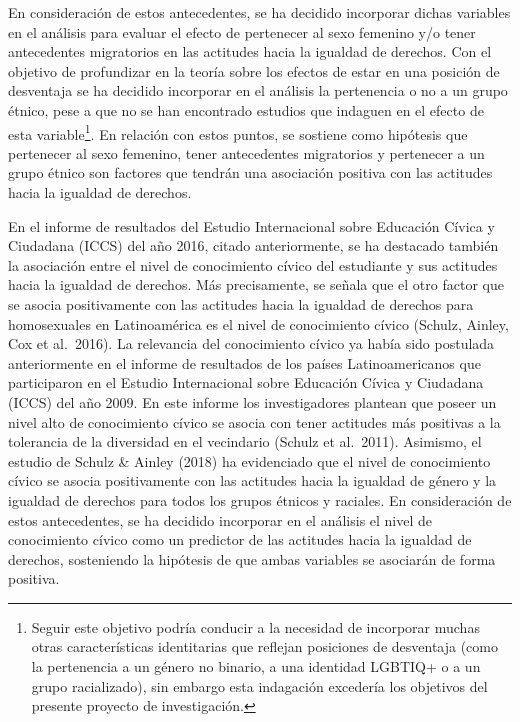\documentclass[12pt,twoside]{templates/facsothesis}
\begin{document}
En consideración de estos antecedentes, se ha decidido incorporar dichas variables en el análisis para evaluar el efecto de pertenecer al sexo femenino y/o tener antecedentes migratorios en las actitudes hacia la igualdad de derechos. Con el objetivo de profundizar en la teoría sobre los efectos de estar en una posición de desventaja se ha decidido incorporar en el análisis la pertenencia o no a un grupo étnico, pese a que no se han encontrado estudios que indaguen en el efecto de esta variable\footnote{Seguir este objetivo podría conducir a la necesidad de incorporar muchas otras características identitarias que reflejan posiciones de desventaja (como la pertenencia a un género no binario, a una identidad LGBTIQ+ o a un grupo racializado), sin embargo esta indagación excedería los objetivos del presente proyecto de investigación.}. En relación con estos puntos, se sostiene como hipótesis que pertenecer al sexo femenino, tener antecedentes migratorios y pertenecer a un grupo étnico son factores que tendrán una asociación positiva con las actitudes hacia la igualdad de derechos.

En el informe de resultados del Estudio Internacional sobre Educación Cívica y Ciudadana (ICCS) del año 2016, citado anteriormente, se ha destacado también la asociación entre el nivel de conocimiento cívico del estudiante y sus actitudes hacia la igualdad de derechos. Más precisamente, se señala que el otro factor que se asocia positivamente con las actitudes hacia la igualdad de derechos para homosexuales en Latinoamérica es el nivel de conocimiento cívico (Schulz, Ainley, Cox et al.~2016). La relevancia del conocimiento cívico ya había sido postulada anteriormente en el informe de resultados de los países Latinoamericanos que participaron en el Estudio Internacional sobre Educación Cívica y Ciudadana (ICCS) del año 2009. En este informe los investigadores plantean que poseer un nivel alto de conocimiento cívico se asocia con tener actitudes más positivas a la tolerancia de la diversidad en el vecindario (Schulz et al.~2011). Asimismo, el estudio de Schulz \& Ainley (2018) ha evidenciado que el nivel de conocimiento cívico se asocia positivamente con las actitudes hacia la igualdad de género y la igualdad de derechos para todos los grupos étnicos y raciales. En consideración de estos antecedentes, se ha decidido incorporar en el análisis el nivel de conocimiento cívico como un predictor de las actitudes hacia la igualdad de derechos, sosteniendo la hipótesis de que ambas variables se asociarán de forma positiva.
\end{document}
